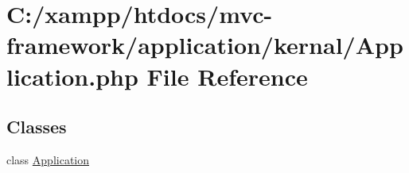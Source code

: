 \hypertarget{_application_8php}{}\section{C\+:/xampp/htdocs/mvc-\/framework/application/kernal/\+Application.php File Reference}
\label{_application_8php}
\subsection*{Classes}
\begin{DoxyCompactItemize}
\item 
class \hyperlink{class_application}{Application}
\end{DoxyCompactItemize}
